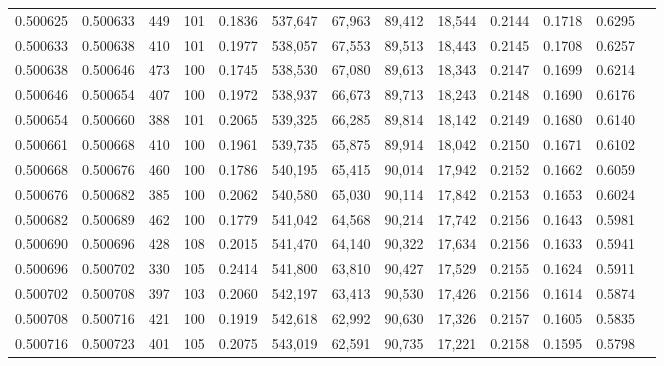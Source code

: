 \begin{tabular}{rrrrrrrrrrrrr}
0.500625 & 0.500633 &   449 & 101 &                                     0.1836 & 537,647 &  67,963 &  89,412 &  18,544 & 0.2144 & 0.1718 & 0.6295 \\
0.500633 & 0.500638 &   410 & 101 &                                     0.1977 & 538,057 &  67,553 &  89,513 &  18,443 & 0.2145 & 0.1708 & 0.6257 \\
0.500638 & 0.500646 &   473 & 100 &                                     0.1745 & 538,530 &  67,080 &  89,613 &  18,343 & 0.2147 & 0.1699 & 0.6214 \\
0.500646 & 0.500654 &   407 & 100 &                                     0.1972 & 538,937 &  66,673 &  89,713 &  18,243 & 0.2148 & 0.1690 & 0.6176 \\
0.500654 & 0.500660 &   388 & 101 &                                     0.2065 & 539,325 &  66,285 &  89,814 &  18,142 & 0.2149 & 0.1680 & 0.6140 \\
0.500661 & 0.500668 &   410 & 100 &                                     0.1961 & 539,735 &  65,875 &  89,914 &  18,042 & 0.2150 & 0.1671 & 0.6102 \\
0.500668 & 0.500676 &   460 & 100 &                                     0.1786 & 540,195 &  65,415 &  90,014 &  17,942 & 0.2152 & 0.1662 & 0.6059 \\
0.500676 & 0.500682 &   385 & 100 &                                     0.2062 & 540,580 &  65,030 &  90,114 &  17,842 & 0.2153 & 0.1653 & 0.6024 \\
0.500682 & 0.500689 &   462 & 100 &                                     0.1779 & 541,042 &  64,568 &  90,214 &  17,742 & 0.2156 & 0.1643 & 0.5981 \\
0.500690 & 0.500696 &   428 & 108 &                                     0.2015 & 541,470 &  64,140 &  90,322 &  17,634 & 0.2156 & 0.1633 & 0.5941 \\
0.500696 & 0.500702 &   330 & 105 &                                     0.2414 & 541,800 &  63,810 &  90,427 &  17,529 & 0.2155 & 0.1624 & 0.5911 \\
0.500702 & 0.500708 &   397 & 103 &                                     0.2060 & 542,197 &  63,413 &  90,530 &  17,426 & 0.2156 & 0.1614 & 0.5874 \\
0.500708 & 0.500716 &   421 & 100 &                                     0.1919 & 542,618 &  62,992 &  90,630 &  17,326 & 0.2157 & 0.1605 & 0.5835 \\
0.500716 & 0.500723 &   401 & 105 &                                     0.2075 & 543,019 &  62,591 &  90,735 &  17,221 & 0.2158 & 0.1595 & 0.5798 \\

\end{tabular}
